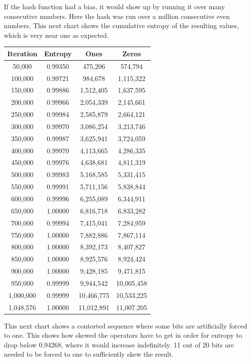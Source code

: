\documentclass[letterpaper]{article}
\begin{document}
If the hash function had a bias, it would show up by running it over many consecutive numbers. Here the hash was run over a million consecutive even numbers. This next chart shows the cumulative entropy of the resulting values, which is very near one as expected.

\begin{center}
\begin{tabular}{|c|c|c|c|}
\hline
\textbf{Iteration} & \textbf{Entropy} & \textbf{Ones} & \textbf{Zeros} \\
\hline
50,000 & 0.99350 & 475,206 & 574,794 \\
100,000 & 0.99721 & 984,678 & 1,115,322 \\
150,000 & 0.99886 & 1,512,405 & 1,637,595 \\
200,000 & 0.99966 & 2,054,339 & 2,145,661 \\
250,000 & 0.99984 & 2,585,879 & 2,664,121 \\
300,000 & 0.99970 & 3,086,254 & 3,213,746 \\
350,000 & 0.99987 & 3,625,941 & 3,724,059 \\
400,000 & 0.99970 & 4,113,665 & 4,286,335 \\
450,000 & 0.99976 & 4,638,681 & 4,811,319 \\
500,000 & 0.99983 & 5,168,585 & 5,331,415 \\
550,000 & 0.99991 & 5,711,156 & 5,838,844 \\
600,000 & 0.99996 & 6,255,089 & 6,344,911 \\
650,000 & 1.00000 & 6,816,718 & 6,833,282 \\
700,000 & 0.99994 & 7,415,041 & 7,284,959 \\
750,000 & 1.00000 & 7,882,886 & 7,867,114 \\
800,000 & 1.00000 & 8,392,173 & 8,407,827 \\
850,000 & 1.00000 & 8,925,576 & 8,924,424 \\
900,000 & 1.00000 & 9,428,185 & 9,471,815 \\
950,000 & 0.99999 & 9,944,542 & 10,005,458 \\
1,000,000 & 0.99999 & 10,466,775 & 10,533,225 \\
1,048,576 & 1.00000 & 11,012,891 & 11,007,205 \\
\hline
\end{tabular}
\end{center}

This next chart shows a contorted sequence where some bits are artificially forced to one. This shows how skewed the operators have to get in order for entropy to drop below 0.94268, where it would increase indefinitely. 11 out of 20 bits are needed to be forced to one to sufficiently skew the result.
\end{document}
